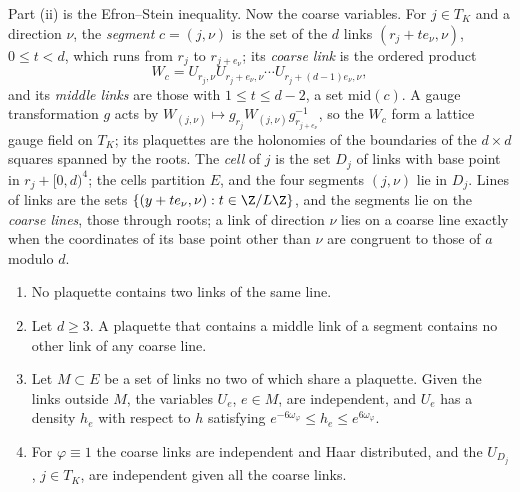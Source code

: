 Part (ii) is the Efron--Stein inequality. Now the coarse variables. For $j\in
T_K$ and a direction $\nu$, the \emph{segment} $c=(j,\nu)$ is the set of the
$d$ links $(r_j+te_\nu,\nu)$, $0\le t<d$, which runs from $r_j$ to
$r_{j+e_\nu}$; its \emph{coarse link} is the ordered product
\[
W_c=U_{r_j,\nu}U_{r_j+e_\nu,\nu}\cdots U_{r_j+(d-1)e_\nu,\nu},
\]
and its \emph{middle links} are those with $1\le t\le d-2$, a set
$\mathrm{mid}(c)$. A gauge transformation $g$ acts by $W_{(j,\nu)}\mapsto
g_{r_j}W_{(j,\nu)}g_{r_{j+e_\nu}}^{-1}$, so the $W_c$ form a lattice gauge
field on $T_K$; its plaquettes are the holonomies of the boundaries of the
$d\times d$ squares spanned by the roots. The \emph{cell} of $j$ is the set
$D_j$ of links with base point in $r_j+[0,d)^4$; the cells partition $E$,
and the four segments $(j,\nu)$ lie in $D_j$. Lines of links are the sets
$\{(y+te_\nu,\nu):t\in\Z/L\Z\}$, and the segments lie on the \emph{coarse
lines}, those through roots; a link of direction $\nu$ lies on a coarse line
exactly when the coordinates of its base point other than $\nu$ are
congruent to those of $a$ modulo $d$.

\begin{lemma}\label{rC12:lines}
\begin{enumerate}[label=\textup{(\roman*)},leftmargin=*]
\item No plaquette contains two links of the same line.
\item Let $d\ge3$. A plaquette that contains a middle link of a segment
contains no other link of any coarse line.
\item Let $M\subset E$ be a set of links no two of which share a plaquette.
Given the links outside $M$, the variables $U_e$, $e\in M$, are independent,
and $U_e$ has a density $h_e$ with respect to $h$ satisfying
$e^{-6\omega_\varphi}\le h_e\le e^{6\omega_\varphi}$.
\item For $\varphi\equiv1$ the coarse links are independent and Haar
distributed, and the $U_{D_j}$, $j\in T_K$, are independent given all the
coarse links.
\end{enumerate}
\end{lemma}

